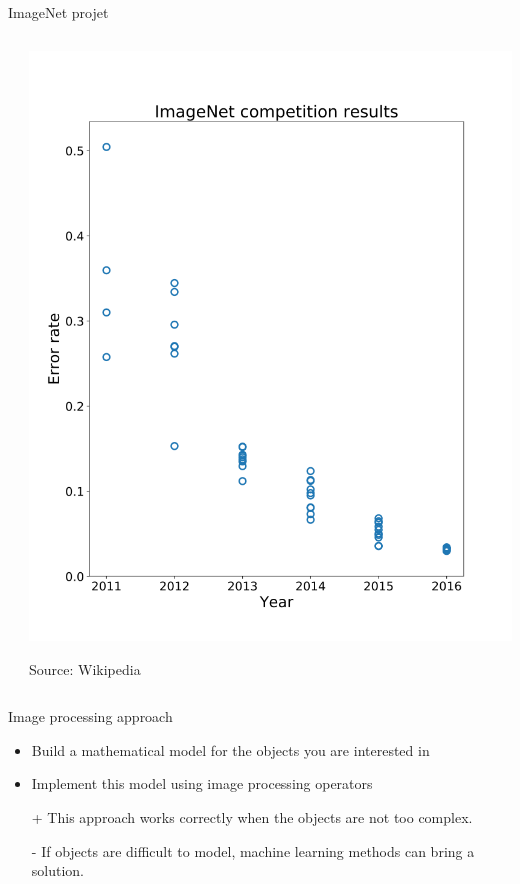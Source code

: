\documentclass[xcolor=pdftex,dvipsnames,table,mathserif]{beamer}
\begin{document}
\begin{frame}{ImageNet projet}
\begin{columns}
\begin{column}{.5\textwidth}
  \end{column}

  \begin{column}{.5\textwidth}
  \centering
  \includegraphics[height=0.75\textheight]{ImageNet_error_history}

  \tiny{Source: Wikipedia}

  \end{column}
\end{columns}

\end{frame}

\begin{frame}{Image processing approach}

  \begin{block}{}
    \begin{itemize}
    \item Build a mathematical model for the objects you are interested in
    \item Implement this model using image processing operators
    \end{itemize}
  \end{block}

\begin{itemize}
\item[+] This approach works correctly when the objects are not too complex.
\item[-] If objects are difficult to model, machine learning methods can bring a solution.
\end{itemize}


\end{frame}
\end{document}
